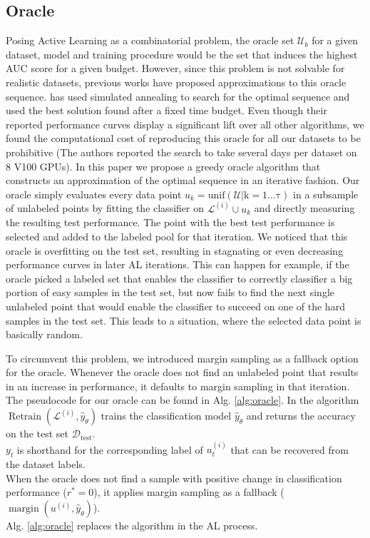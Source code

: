 \documentclass[]{article}
\begin{document}
\subsection{Oracle}\label{sec:oracle}
Posing Active Learning as a combinatorial problem, the oracle set $\mathcal{U}_b$ for a given dataset, model and training procedure would be the set that induces the highest AUC score for a given budget.
However, since this problem is not solvable for realistic datasets, previous works have proposed approximations to this oracle sequence. 
\cite{zhou2021towards} has used simulated annealing to search for the optimal sequence and used the best  solution found after a fixed time budget. 
Even though their reported performance curves display a significant lift over all other algorithms, we found the computational cost of reproducing this oracle for all our datasets to be prohibitive (The authors reported the search to take several days per dataset on 8 V100 GPUs).
In this paper we propose a greedy oracle algorithm that constructs an approximation of the optimal sequence in an iterative fashion.
Our oracle simply evaluates every data point $u_k = \operatorname{unif(\mathcal{U} | k = 1 \ldots \tau)}$ in a subsample of unlabeled points by fitting the classifier on $\mathcal{L}^{(i)} \cup u_k$ and directly measuring the resulting test performance.
The point with the best test performance is selected and added to the labeled pool for that iteration.
We noticed that this oracle is overfitting on the test set, resulting in stagnating or even decreasing performance curves in later AL iterations.
This can happen for example, if the oracle picked a labeled set that enables the classifier to correctly classifier a big portion of easy samples in the test set, but now fails to find the next single unlabeled point that would enable the classifier to succeed on one of the hard samples in the test set.
This leads to a situation, where the selected data point is basically random.\\
\begin{minipage}{0.5\linewidth}
	
	To circumvent this problem, we introduced margin sampling \cite{wang2014new} as a fallback option for the oracle.
	Whenever the oracle does not find an unlabeled point that results in an increase in performance, it defaults to margin sampling in that iteration.
	The pseudocode for our oracle can be found in Alg. \ref{alg:oracle}.
	In the algorithm $\operatorname{Retrain}(\mathcal{L}^{(i)}, \hat y_\theta)$ trains the classification model $\hat y_\theta$ and returns the accuracy on the test set $\mathcal{D}_\text{test}$. \\ 
	$y_t$ is shorthand for the corresponding label of $u^{(i)}_{t}$ that can be recovered from the dataset labels. \\
	When the oracle does not find a sample with positive change in classification performance ($r^* = 0$), it applies margin sampling as a fallback ($\operatorname{margin}(u^{(i)}, \hat y_\theta)$). \\
	Alg. \ref{alg:oracle} replaces the algorithm in the AL process.
\end{minipage}
\end{document}

